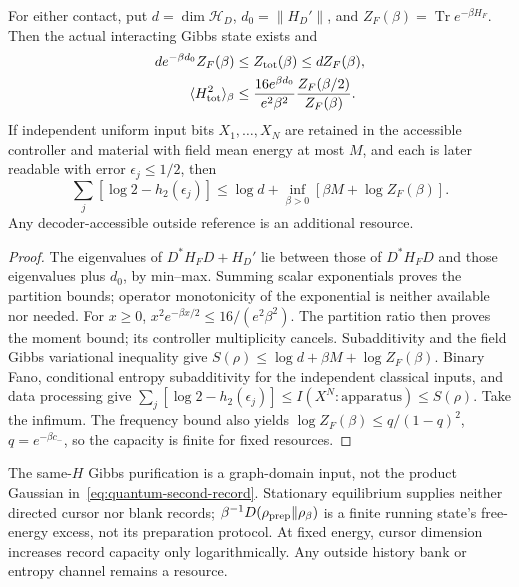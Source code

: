 \begin{proposition}
\label{prop:quantum-material-thermal}
For either contact, put $d=\dim\mathcal H_D$,
$d_0=\|H_D'\|$, and $Z_F(\beta)=\operatorname{Tr}e^{-\beta H_F}$.
Then the actual interacting Gibbs state exists and
\begin{align}
 d e^{-\beta d_0}Z_F(\beta)
 &\le Z_{\rm tot}(\beta)\le d Z_F(\beta),\nonumber\\
 \langle H_{\rm tot}^2\rangle_\beta
 &\le\frac{16e^{\beta d_0}}{e^2\beta^2}
                 \frac{Z_F(\beta/2)}{Z_F(\beta)}.
 \label{eq:quantum-material-partition}
\end{align}
If independent uniform input bits $X_1,\ldots,X_N$ are retained in
the accessible controller and material with field mean energy at most
$M$, and each is later readable with error
$\epsilon_j\le1/2$, then
\begin{equation}
 \sum_j[\log2-h_2(\epsilon_j)]\le
 \log d+\inf_{\beta>0}[\beta M+\log Z_F(\beta)] .
 \label{eq:quantum-record-capacity}
\end{equation}
Any decoder-accessible outside reference is an additional resource.
\end{proposition}
\begin{proof}
The eigenvalues of $D^*H_FD+H_D'$ lie between those of $D^*H_FD$
and those eigenvalues plus $d_0$, by min--max. Summing scalar
exponentials proves the partition bounds; operator monotonicity of
the exponential is neither available nor needed.
For $x\ge0$,
$x^2e^{-\beta x/2}\le16/(e^2\beta^2)$.
The partition ratio then proves the moment bound; its controller
multiplicity cancels.
Subadditivity and the field Gibbs variational inequality give
$S(\rho)\le\log d+\beta M+\log Z_F(\beta)$.
Binary Fano, conditional entropy subadditivity for the independent
classical inputs, and data processing give
$\sum_j[\log2-h_2(\epsilon_j)]\le I(X^N:\text{apparatus})\le S(\rho)$.
Take the infimum. The frequency bound also yields
$\log Z_F(\beta)\le q/(1-q)^2$, $q=e^{-\beta c_-}$, so the
capacity is finite for fixed resources.
\end{proof}

The same-$H$ Gibbs purification is a graph-domain input, not the
product Gaussian in~\eqref{eq:quantum-second-record}. Stationary
equilibrium supplies neither directed cursor nor blank records;
$\beta^{-1}D(\rho_{\rm prep}\|\rho_\beta)$ is a finite running
state's free-energy excess, not its preparation protocol. At fixed
energy, cursor dimension increases record capacity only logarithmically.
Any outside history bank or entropy channel remains a resource.

